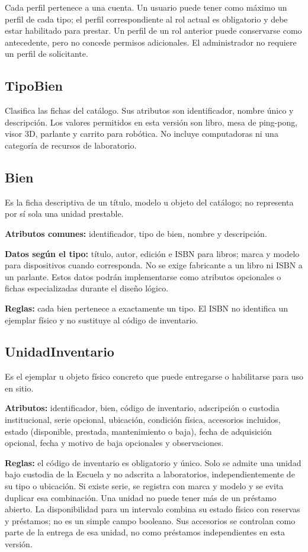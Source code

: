 Cada perfil pertenece a una cuenta. Un usuario puede tener como m\'aximo un perfil de cada tipo; el perfil correspondiente al rol actual es obligatorio y debe estar habilitado para prestar. Un perfil de un rol anterior puede conservarse como antecedente, pero no concede permisos adicionales. El administrador no requiere un perfil de solicitante.

\subsection{TipoBien}
Clasifica las fichas del cat\'alogo. Sus atributos son identificador, nombre \'unico y descripci\'on. Los valores permitidos en esta versi\'on son libro, mesa de ping-pong, visor 3D, parlante y carrito para rob\'otica. No incluye computadoras ni una categor\'ia de recursos de laboratorio.

\subsection{Bien}
Es la ficha descriptiva de un t\'itulo, modelo u objeto del cat\'alogo; no representa por s\'i sola una unidad prestable.

\textbf{Atributos comunes:} identificador, tipo de bien, nombre y descripci\'on.

\textbf{Datos seg\'un el tipo:} t\'itulo, autor, edici\'on e ISBN para libros; marca y modelo para dispositivos cuando corresponda. No se exige fabricante a un libro ni ISBN a un parlante. Estos datos podr\'an implementarse como atributos opcionales o fichas especializadas durante el dise\~no l\'ogico.

\textbf{Reglas:} cada bien pertenece a exactamente un tipo. El ISBN no identifica un ejemplar f\'isico y no sustituye al c\'odigo de inventario.

\subsection{UnidadInventario}
Es el ejemplar u objeto f\'isico concreto que puede entregarse o habilitarse para uso en sitio.

\textbf{Atributos:} identificador, bien, c\'odigo de inventario, adscripci\'on o custodia institucional, serie opcional, ubicaci\'on, condici\'on f\'isica, accesorios incluidos, estado (disponible, prestada, mantenimiento o baja), fecha de adquisici\'on opcional, fecha y motivo de baja opcionales y observaciones.

\textbf{Reglas:} el c\'odigo de inventario es obligatorio y \'unico. Solo se admite una unidad bajo custodia de la Escuela y no adscrita a laboratorios, independientemente de su tipo o ubicaci\'on. Si existe serie, se registra con marca y modelo y se evita duplicar esa combinaci\'on. Una unidad no puede tener m\'as de un pr\'estamo abierto. La disponibilidad para un intervalo combina su estado f\'isico con reservas y pr\'estamos; no es un simple campo booleano. Sus accesorios se controlan como parte de la entrega de esa unidad, no como pr\'estamos independientes en esta versi\'on.

